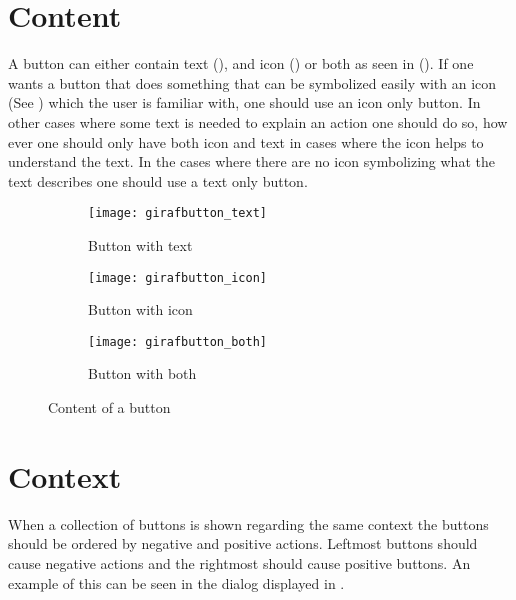 
\section{Content}
\label{sec:button_content}

A button can either contain text (), and icon () or both as seen in (). If one wants a button that does something that can be symbolized easily with an icon (See ) which the user is familiar with, one should use an icon only button. In other cases where some text is needed to explain an action one should do so, how ever one should only have both icon and text in cases where the icon helps to understand the text. In the cases where there are no icon symbolizing what the text describes one should use a text only button.

\begin{figure}[!htbp]
    \centering

    \begin{subfigure}[t]{0.3\textwidth}
    	\centering
        \texttt{[image: girafbutton\_text]}
        \caption{Button with text}
        \label{fig:girafbutton_text}
    \end{subfigure}
    \hspace{1em} 
    \begin{subfigure}[t]{0.3\textwidth}
    	\centering
        \texttt{[image: girafbutton\_icon]}
        \caption{Button with icon}
        \label{fig:girafbutton_icon}
    \end{subfigure}
    \hspace{1em} 
    \begin{subfigure}[t]{0.3\textwidth}
    	\centering
        \texttt{[image: girafbutton\_both]}
        \caption{Button with both}
        \label{fig:girafbutton_both}
    \end{subfigure}
    
    \caption{Content of a button}
    \label{fig:girafbutton_content}
\end{figure}

\section{Context}
\label{sec:button_context}

When a collection of buttons is shown regarding the same context the buttons should be ordered by negative and positive actions. Leftmost buttons should cause negative actions and the rightmost should cause positive buttons. An example of this can be seen in the dialog displayed in .